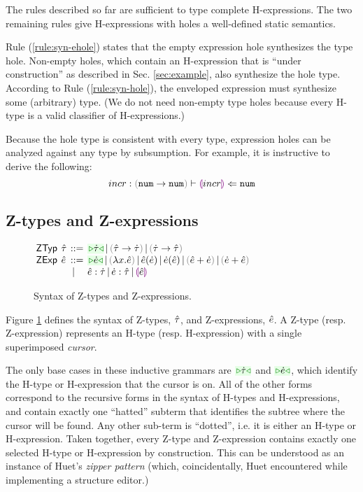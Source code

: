 The rules described so far are sufficient to type complete
H-expressions. The two remaining rules give H-expressions with holes a
well-defined static semantics. 

Rule (\ref{rule:syn-ehole}) states that the empty expression hole
synthesizes the type hole. Non-empty holes, which contain an H-expression that is ``under construction'' 
as described in Sec. \ref{sec:example}, also synthesize the hole type. According to Rule
(\ref{rule:syn-hole}), the enveloped expression must synthesize some (arbitrary) type. (We do not need non-empty type holes because every H-type is a valid classifier of H-expressions.)

Because the hole type is consistent with every type, expression holes can be analyzed against any type by subsumption. For example, it is instructive to derive the following:
\[\hana{incr : \tarr{\tnum}{\tnum}}{\hhole{incr}}{\tnum}\]


\subsection{Z-types and Z-expressions}\label{sec:cursors}
\newcommand{\cvert}{{\,{\vert}\,}}
\begin{figure}[t]
$\arraycolsep=2pt\begin{array}{lllllll}
\mathsf{ZTyp} & \ztau & ::= &
  \zwsel{\htau} \cvert
  \tarr{\ztau}{\htau} \cvert
  \tarr{\htau}{\ztau} \\
\mathsf{ZExp} & \zexp & ::= &
  \zwsel{\hexp} \cvert
  \hlam{x}{\zexp} \cvert
  \hap{\zexp}{\hexp} \cvert
  \hap{\hexp}{\zexp} \cvert
  \hadd{\zexp}{\hexp} \cvert
  \hadd{\hexp}{\zexp} \\
& & \cvert & 
    \zexp : \htau \cvert
  \hexp : \ztau \cvert
  \hhole{\zexp}
\end{array}$
\caption{Syntax of Z-types and Z-expressions.}
\label{fig:zexp-syntax}
\end{figure}

Figure \ref{fig:zexp-syntax} defines the syntax of
Z-types, $\hat{\tau}$, and Z-expressions, $\hat{e}$. A Z-type (resp. Z-expression) represents an
H-type (resp. H-expression) with a single superimposed \emph{cursor}. 

The only base cases in these inductive grammars are $\zwsel{\htau}$ and
$\zwsel{\hexp}$, which identify the H-type or H-expression that the cursor
is on. All of the other forms correspond to the recursive forms in the
syntax of H-types and H-expressions, and contain exactly one ``hatted''
subterm that identifies the subtree where the cursor will be found. Any
other sub-term is ``dotted'', i.e. it is either an H-type or
H-expression. Taken together, every Z-type and Z-expression contains
exactly one selected H-type or H-expression by construction. This can be
understood as an instance of Huet's \emph{zipper pattern}
\cite{JFP::Huet1997} (which, coincidentally, Huet encountered while
implementing a structure editor.)

